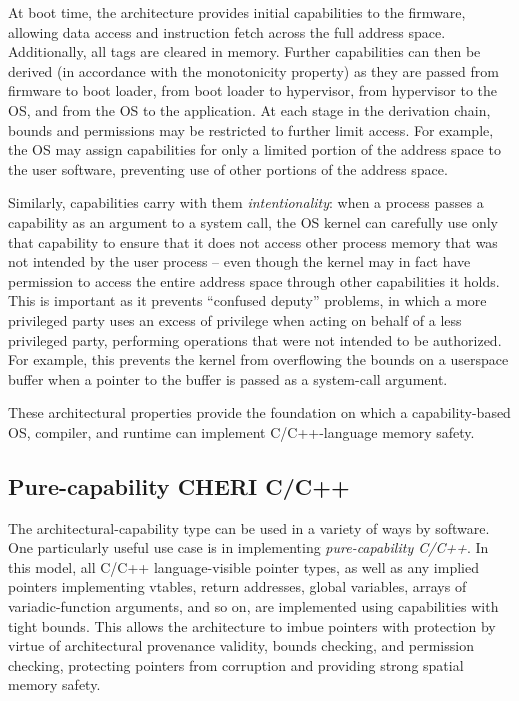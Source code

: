 \documentclass[12pt,twoside,openright,a4paper]{article}
\newcommand{\note}[2]{{\color{blue}[ Note: #1 - #2]}}
\renewcommand{\note}[2]{\relax\ifhmode\unskip\fi}
\newcommand{\rwnote}[1]{\note{#1}{Robert W.}}
\newcommand{\pgnnote}[1]{\note{#1}{Peter N.}}
\begin{document}
At boot time, the architecture provides initial capabilities to the firmware,
allowing data access and instruction fetch across the full address space.
Additionally, all tags are cleared in memory.
Further capabilities can then be derived (in accordance with the monotonicity
property) as they are passed from firmware to boot loader, from boot loader to
hypervisor, from hypervisor to the OS, and from the OS to the application.
At each stage in the derivation chain, bounds and permissions may be
restricted to further limit access.
For example, the OS may assign capabilities for only a limited portion of the
address space to the user software, preventing use of other portions of the
address space.



Similarly, capabilities carry with them \textit{intentionality}: when a
process passes a capability as an argument to a system call, the OS kernel can
carefully use only that capability to ensure that it does not access other
process memory that was not intended by the user process -- even though the
kernel may in fact have permission to access the entire address space through
other capabilities it holds.
This is important as it prevents ``confused deputy'' problems, in which a more
privileged party uses an excess of privilege when acting on behalf of a less
privileged party, performing operations that were not intended to be
authorized.
For example, this prevents the kernel from overflowing the bounds on a
userspace buffer when a pointer to the buffer is passed as a
system-call argument.

These architectural properties provide the foundation on which a
capability-based OS, compiler, and runtime can implement C/C++-language memory
safety.

\subsection{Pure-capability CHERI C/C++}

The architectural-capability type can be used in a variety of ways by
software.
One particularly useful use case is in implementing \textit{pure-capability
C/C++}.
In this model, all C/C++ language-visible pointer types, as well as any
implied pointers implementing vtables, return addresses, global variables,
arrays of variadic-function arguments, and so on, are implemented using
capabilities with tight bounds.
This allows the architecture to imbue pointers with protection by virtue of
architectural provenance validity, bounds checking, and permission checking,
protecting pointers from corruption and providing strong spatial memory
safety.
\end{document}
